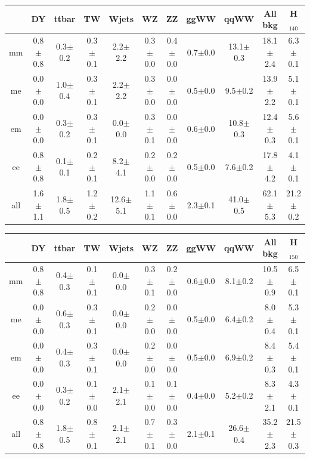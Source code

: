 \begin{table}[!ht]
\begin{center}
{\begin{tabular} {|c|c|c|c|c|c|c|c|c||c||c|}
 \hline
  \end{tabular}
  }
 {\footnotesize
  \begin{tabular} {|c|c|c|c|c|c|c|c|c||c||c|}
\hline
  & DY & ttbar & TW & Wjets & WZ & ZZ & ggWW & qqWW & {\bf All bkg} & {\bf H$_{140}$}\\
  \hline
  \hline
  mm & 0.8$\pm$0.8 &  0.3$\pm$0.2 &  0.3$\pm$0.1 &  2.2$\pm$2.2 &  0.3$\pm$0.0 &  0.4$\pm$0.0 &  0.7$\pm$0.0 & 13.1$\pm$0.3 & 18.1$\pm$2.4 & 6.3$\pm$0.1 \\
  me & 0.0$\pm$0.0 &  1.0$\pm$0.4 &  0.3$\pm$0.1 &  2.2$\pm$2.2 &  0.3$\pm$0.0 &  0.0$\pm$0.0 &  0.5$\pm$0.0 &  9.5$\pm$0.2 & 13.9$\pm$2.2 & 5.1$\pm$0.1 \\
  em & 0.0$\pm$0.0 &  0.3$\pm$0.2 &  0.3$\pm$0.1 &  0.0$\pm$0.0 &  0.3$\pm$0.1 &  0.0$\pm$0.0 &  0.6$\pm$0.0 & 10.8$\pm$0.3 & 12.4$\pm$0.3 & 5.6$\pm$0.1 \\
  ee & 0.8$\pm$0.8 &  0.1$\pm$0.1 &  0.2$\pm$0.1 &  8.2$\pm$4.1 &  0.2$\pm$0.0 &  0.2$\pm$0.0 &  0.5$\pm$0.0 &  7.6$\pm$0.2 & 17.8$\pm$4.2 & 4.1$\pm$0.1 \\
 \hline
 all & 1.6$\pm$1.1 &  1.8$\pm$0.5 &  1.2$\pm$0.2 & 12.6$\pm$5.1 &  1.1$\pm$0.1 &  0.6$\pm$0.0 &  2.3$\pm$0.1 & 41.0$\pm$0.5 & 62.1$\pm$5.3 & 21.2$\pm$0.2 \\
 \hline
  \end{tabular}
  }
 {\footnotesize
  \begin{tabular} {|c|c|c|c|c|c|c|c|c||c||c|}
\hline
  & DY & ttbar & TW & Wjets & WZ & ZZ & ggWW & qqWW & {\bf All bkg} & {\bf H$_{150}$}\\
  \hline
  \hline
  mm & 0.8$\pm$0.8 &  0.4$\pm$0.3 &  0.1$\pm$0.1 &  0.0$\pm$0.0 &  0.3$\pm$0.1 &  0.2$\pm$0.0 &  0.6$\pm$0.0 &  8.1$\pm$0.2 & 10.5$\pm$0.9 & 6.5$\pm$0.1 \\
  me & 0.0$\pm$0.0 &  0.6$\pm$0.3 &  0.3$\pm$0.1 &  0.0$\pm$0.0 &  0.2$\pm$0.0 &  0.0$\pm$0.0 &  0.5$\pm$0.0 &  6.4$\pm$0.2 &  8.0$\pm$0.4 & 5.3$\pm$0.1 \\
  em & 0.0$\pm$0.0 &  0.4$\pm$0.3 &  0.3$\pm$0.1 &  0.0$\pm$0.0 &  0.2$\pm$0.0 &  0.0$\pm$0.0 &  0.5$\pm$0.0 &  6.9$\pm$0.2 &  8.4$\pm$0.3 & 5.4$\pm$0.1 \\
  ee & 0.0$\pm$0.0 &  0.3$\pm$0.2 &  0.1$\pm$0.0 &  2.1$\pm$2.1 &  0.1$\pm$0.0 &  0.1$\pm$0.0 &  0.4$\pm$0.0 &  5.2$\pm$0.2 &  8.3$\pm$2.1 & 4.3$\pm$0.1 \\
 \hline
 all & 0.8$\pm$0.8 &  1.8$\pm$0.5 &  0.8$\pm$0.1 &  2.1$\pm$2.1 &  0.7$\pm$0.1 &  0.3$\pm$0.0 &  2.1$\pm$0.1 & 26.6$\pm$0.4 & 35.2$\pm$2.3 & 21.5$\pm$0.3 \\

\end{tabular}}
\end{center}
\end{table}
